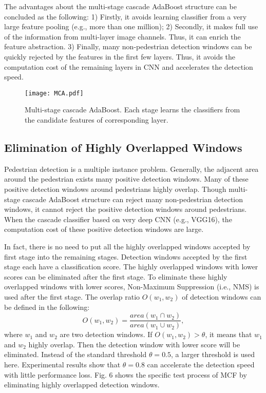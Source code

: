 \documentclass[journal]{IEEEtran}
\begin{document}
The advantages about the multi-stage cascade AdaBoost structure can be concluded as the following: 1) Firstly, it avoids learning classifier from a very large feature pooling (e.g., more than one million); 2) Secondly, it makes full use of the information from multi-layer image channels. Thus, it can enrich the feature abstraction. 3) Finally, many non-pedestrian detection windows can be quickly rejected by the features in the first few layers. Thus, it avoids the computation cost of the remaining layers in CNN and accelerates the detection speed.

\begin{figure}[!t]
\label{MCA}
\centering
\texttt{[image: MCA.pdf]}
\caption{Multi-stage cascade AdaBoost. Each stage learns the classifiers from the candidate features of corresponding layer.} 
\end{figure}

\subsection{Elimination of Highly Overlapped Windows}
Pedestrian detection is a multiple instance problem. Generally, the adjacent area around the pedestrian exists many positive detection windows. Many of these positive detection windows around pedestrians highly overlap. Though multi-stage cascade AdaBoost structure can reject many non-pedestrian detection windows, it cannot reject the positive detection windows around pedestrians. When the cascade classifier based on very deep CNN (e.g., VGG16), the computation cost of these positive detection windows are large.

In fact, there is no need to put all the highly overlapped windows accepted by first stage into the remaining stages. Detection windows accepted by the first stage each have a classification score. The highly overlapped windows with lower scores can be eliminated after the first stage. To eliminate these highly overlapped windows with lower scores, Non-Maximum Suppression (i.e., NMS) is used after the first stage. The overlap ratio $O(w_1,w_2)$ of detection windows can be defined in the following:
\begin{equation}
O(w_1,w_2)=\frac{area(w_1 \cap w_2)}{area(w_1 \cup w_2)},
\end{equation}
where $w_1$ and $w_2$  are two detection windows. If $O(w_1,w_2)>\theta$, it means that $w_1$ and $w_2$ highly overlap. Then the detection window with lower score will be eliminated. Instead of the standard threshold $\theta=0.5$, a larger threshold is used here. Experimental results show that $\theta=0.8$ can accelerate the detection speed with little performance loss. Fig. 6 shows the specific test process of MCF by eliminating highly overlapped detection windows.
\end{document}
